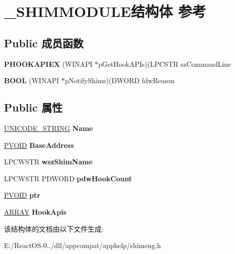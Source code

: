 \hypertarget{struct___s_h_i_m_m_o_d_u_l_e}{}\section{\+\_\+\+S\+H\+I\+M\+M\+O\+D\+U\+L\+E结构体 参考}
\label{struct___s_h_i_m_m_o_d_u_l_e}
\subsection*{Public 成员函数}
\begin{DoxyCompactItemize}
\item 
\mbox{\label{struct___s_h_i_m_m_o_d_u_l_e_a22f90bd2109de6a049ac04e699491474}} 
{\bfseries P\+H\+O\+O\+K\+A\+P\+I\+EX} (W\+I\+N\+A\+PI $\ast$p\+Get\+Hook\+A\+P\+Is)(L\+P\+C\+S\+TR sz\+Command\+Line
\item 
\mbox{\label{struct___s_h_i_m_m_o_d_u_l_e_a41366327feb3981bde03e4802dd0f963}} 
{\bfseries B\+O\+OL} (W\+I\+N\+A\+PI $\ast$p\+Notify\+Shims)(D\+W\+O\+RD fdw\+Reason
\end{DoxyCompactItemize}
\subsection*{Public 属性}
\begin{DoxyCompactItemize}
\item 
\mbox{\label{struct___s_h_i_m_m_o_d_u_l_e_a0a235645e2b209c23fe54ce17da08f0c}} 
\hyperlink{struct___u_n_i_c_o_d_e___s_t_r_i_n_g}{U\+N\+I\+C\+O\+D\+E\+\_\+\+S\+T\+R\+I\+NG} {\bfseries Name}
\item 
\mbox{\label{struct___s_h_i_m_m_o_d_u_l_e_a246208a4f64595be2afd848ea94b2fc4}} 
\hyperlink{interfacevoid}{P\+V\+O\+ID} {\bfseries Base\+Address}
\item 
\mbox{\label{struct___s_h_i_m_m_o_d_u_l_e_adbd77b14dd08b6f0400374d02f54af1c}} 
L\+P\+C\+W\+S\+TR {\bfseries wsz\+Shim\+Name}
\item 
\mbox{\label{struct___s_h_i_m_m_o_d_u_l_e_a124cbc82c1a9af09c33796387741635b}} 
L\+P\+C\+W\+S\+TR P\+D\+W\+O\+RD {\bfseries pdw\+Hook\+Count}
\item 
\mbox{\label{struct___s_h_i_m_m_o_d_u_l_e_a6620360c97620e7a19f16e5cd1d9c6ab}} 
\hyperlink{interfacevoid}{P\+V\+O\+ID} {\bfseries ptr}
\item 
\mbox{\label{struct___s_h_i_m_m_o_d_u_l_e_a52f51ca13e8651b3622d6d8bebfb8efa}} 
\hyperlink{struct___a_r_r_a_y}{A\+R\+R\+AY} {\bfseries Hook\+Apis}
\end{DoxyCompactItemize}


该结构体的文档由以下文件生成\+:\begin{DoxyCompactItemize}
\item 
E\+:/\+React\+O\+S-\/0../dll/appcompat/apphelp/shimeng.\+h\end{DoxyCompactItemize}
